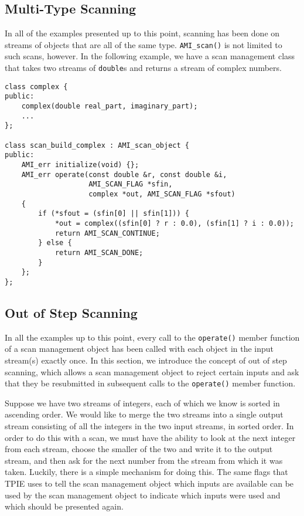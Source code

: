 \subsection{Multi-Type Scanning}


In all of the examples presented up to this point, scanning has been
done on streams of objects that are all of the same type.
\verb|AMI_scan()| is not limited to such scans, however.  In the
following example, we have a scan management class that takes two
streams of \verb|double|s and returns a stream of complex numbers.

\begin{verbatim}
class complex {
public:
    complex(double real_part, imaginary_part);
    ...
};

class scan_build_complex : AMI_scan_object {
public:
    AMI_err initialize(void) {};
    AMI_err operate(const double &r, const double &i, 
                    AMI_SCAN_FLAG *sfin,
                    complex *out, AMI_SCAN_FLAG *sfout)
    {
        if (*sfout = (sfin[0] || sfin[1])) {
            *out = complex((sfin[0] ? r : 0.0), (sfin[1] ? i : 0.0));
            return AMI_SCAN_CONTINUE;
        } else {
            return AMI_SCAN_DONE;
        }   
    };
};
\end{verbatim}

\subsection{Out of Step Scanning}
\label{sec:out-of-step}

In all the examples up to this point, every call to the
\verb|operate()| member function of a scan management object has been
called with each object in the input stream(s) exactly once.  In this
section, we introduce the concept of out of step scanning, which
allows a scan management object to reject certain inputs and ask that
they be resubmitted in subsequent calls to the \verb|operate()| member
function.

Suppose we have two streams of integers, each of which we know is
sorted in ascending order.  We would like to merge the two streams
into a single output stream consisting of all the integers in the two
input streams, in sorted order.  In order to do this with a scan, we
must have the ability to look at the next integer from each stream,
choose the smaller of the two and write it to the output stream, and
then ask for the next number from the stream from which it was taken.
Luckily, there is a simple mechanism for doing this.  The same flags
that TPIE uses to tell the scan management object which inputs are
available can be used by the scan management object to indicate which
inputs were used and which should be presented again.

